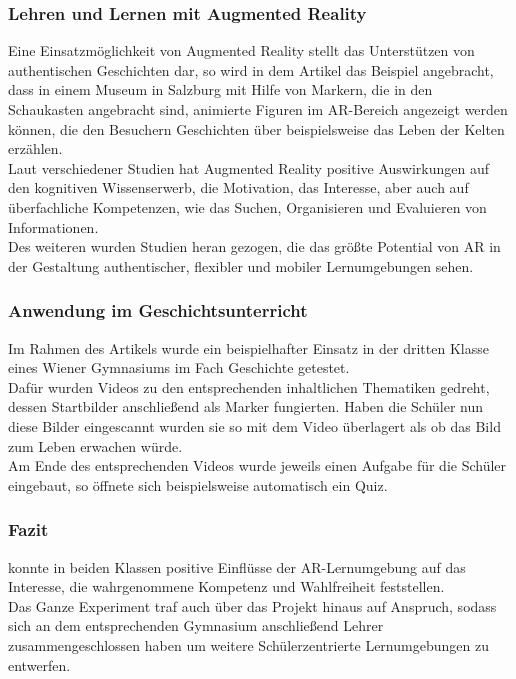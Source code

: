 \subsubsection{Lehren und Lernen mit Augmented Reality}
Eine Einsatzmöglichkeit von Augmented Reality stellt das Unterstützen von authentischen Geschichten dar, so wird in dem Artikel das Beispiel angebracht, dass in einem Museum in Salzburg mit Hilfe von Markern, die in den Schaukasten angebracht sind, animierte Figuren im AR-Bereich angezeigt werden können, die den Besuchern Geschichten über beispielsweise das Leben der Kelten erzählen. \\
Laut verschiedener Studien hat Augmented Reality positive Auswirkungen auf den kognitiven Wissenserwerb, die Motivation, das Interesse, aber auch auf überfachliche Kompetenzen, wie das Suchen, Organisieren und Evaluieren von Informationen. \\
Des weiteren wurden Studien heran gezogen, die das größte Potential von AR in der Gestaltung authentischer, flexibler und mobiler Lernumgebungen sehen. \citep[Kapitel 3]{buchner:ar-geschichtsunterricht}

\subsubsection{Anwendung im Geschichtsunterricht}
Im Rahmen des Artikels wurde ein beispielhafter Einsatz in der dritten Klasse eines Wiener Gymnasiums im Fach Geschichte getestet.\\
Dafür wurden Videos zu den entsprechenden inhaltlichen Thematiken gedreht, dessen Startbilder anschließend als Marker fungierten. Haben die Schüler nun diese Bilder eingescannt wurden sie so mit dem Video überlagert als ob das Bild zum Leben erwachen würde. \\
Am Ende des entsprechenden Videos wurde jeweils einen Aufgabe für die Schüler eingebaut, so öffnete sich beispielsweise automatisch ein Quiz. \citep[Kapitel 4]{buchner:ar-geschichtsunterricht}

\subsubsection{Fazit}
\citeauthor{buchner:ar-geschichtsunterricht} konnte in beiden Klassen positive Einflüsse der AR-Lernumgebung auf das Interesse, die wahrgenommene Kompetenz und Wahlfreiheit feststellen.\\
Das Ganze Experiment traf auch über das Projekt hinaus auf Anspruch, sodass sich an dem entsprechenden Gymnasium anschließend Lehrer zusammengeschlossen haben um weitere Schülerzentrierte Lernumgebungen zu entwerfen. \citep[Kapitel 5-6]{buchner:ar-geschichtsunterricht}



